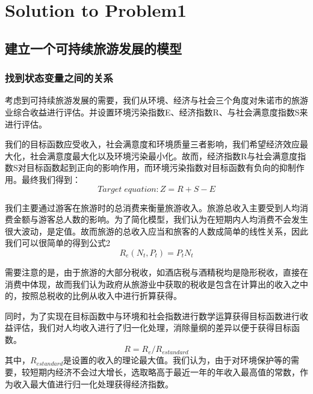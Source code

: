 \documentclass[12pt]{article}  %
\begin{document}
\section{Solution to Problem1}
\subsection{建立一个可持续旅游发展的模型}
\subsubsection{找到状态变量之间的关系}
考虑到可持续旅游发展的需要，我们从环境、经济与社会三个角度对朱诺市的旅游业综合收益进行评估。并设置环境污染指数E、经济指数R、与社会满意度指数S来进行评估。

我们的目标函数应受收入，社会满意度和环境质量三者影响，我们希望经济效应最大化，社会满意度最大化以及环境污染最小化。故而，经济指数R与社会满意度指数S对目标函数起到正向的影响作用，而环境污染指数对目标函数有负向的抑制作用。最终我们得到：
\begin{equation}
	Target\; equation:Z=R+S-E
\end{equation}

我们主要通过游客在旅游时的总消费来衡量旅游收入。旅游总收入主要受到人均消费金额与游客总人数的影响。为了简化模型，我们认为在短期内人均消费不会发生很大波动，是定值。故而旅游的总收入应当和旅客的人数成简单的线性关系，因此我们可以很简单的得到公式2
\begin{equation}
    R_{e}(N_{t},P_{t}) = P_{t}N_{t}
\end{equation}

需要注意的是，由于旅游的大部分税收，如酒店税与酒精税均是隐形税收，直接在消费中体现，故而我们认为政府从旅游业中获取的税收是包含在计算出的收入之中的，按照总税收的比例从收入中进行折算获得。

同时，为了实现在目标函数中与环境和社会指数进行数学运算获得目标函数进行收益评估，我们对人均收入进行了归一化处理，消除量纲的差异以便于获得目标函数。
\begin{equation}
    R = R_{e}/R_{estandard}
\end{equation}
其中，$R_{estandard}$是设置的收入的理论最大值。我们认为，由于对环境保护等的需要，较短期内经济不会过大增长，选取略高于最近一年的年收入最高值的常数，作为收入最大值进行归一化处理获得经济指数。
\end{document}

